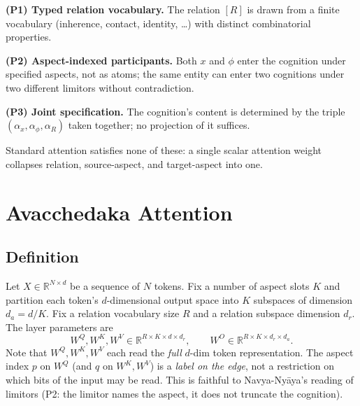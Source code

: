 \documentclass{article}
\newcommand{\R}{\mathbb{R}}
\begin{document}
\textbf{(P1) Typed relation vocabulary.} The relation $[R]$ is drawn
from a finite vocabulary (inherence, contact, identity, \ldots) with
distinct combinatorial properties.

\textbf{(P2) Aspect-indexed participants.} Both $x$ and $\phi$ enter
the cognition under specified aspects, not as atoms; the same entity
can enter two cognitions under two different limitors without
contradiction.

\textbf{(P3) Joint specification.} The cognition's content is
determined by the triple $(\alpha_x, \alpha_\phi, \alpha_R)$ taken
together; no projection of it suffices.

Standard attention satisfies none of these: a single scalar attention
weight collapses relation, source-aspect, and target-aspect into one.

\section{Avacchedaka Attention}
\label{sec:method}

\subsection{Definition}

Let $X \in \R^{N \times d}$ be a sequence of $N$ tokens. Fix a number
of aspect slots $K$ and partition each token's $d$-dimensional output
space into $K$ subspaces of dimension $d_a = d/K$. Fix a relation
vocabulary size $R$ and a relation subspace dimension $d_r$. The
layer parameters are
\begin{equation}
  W^Q, W^K, W^V \in \R^{R \times K \times d \times d_r}, \qquad
  W^O \in \R^{R \times K \times d_r \times d_a}.
\end{equation}
Note that $W^Q, W^K, W^V$ each read the \emph{full} $d$-dim token
representation. The aspect index $p$ on $W^Q$ (and $q$ on $W^K, W^V$) is
a \emph{label on the edge}, not a restriction on which bits of the
input may be read. This is faithful to Navya-Ny\=aya's reading of
limitors (P2: the limitor names the aspect, it does not truncate the
cognition).
\end{document}
